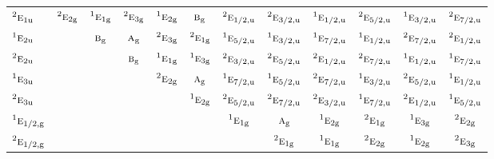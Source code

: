 \documentclass[10pt,a4paper]{article}
\numberwithin{equation}{section}
\newcommand{\irr}[1]{\text{\normalfont\scshape #1}}
\newcommand{\conjpair}[1]{{}^{#1}}
\newcommand{\ptag}[1]{\mathrm{#1}}
\begin{document}
{\begin{longtable}{@{}lccccccccccc@{}}
$\conjpair{2}\irr{e}_{1\ptag{u}}$ & $\conjpair{2}\irr{e}_{2\ptag{g}}$ & $\conjpair{1}\irr{e}_{1\ptag{g}}$ & $\conjpair{2}\irr{e}_{3\ptag{g}}$ & $\conjpair{1}\irr{e}_{2\ptag{g}}$ & $\irr{b}_{\ptag{g}}$ & $\conjpair{2}\irr{e}_{1/2,\ptag{u}}$ & $\conjpair{2}\irr{e}_{3/2,\ptag{u}}$ & $\conjpair{1}\irr{e}_{1/2,\ptag{u}}$ & $\conjpair{2}\irr{e}_{5/2,\ptag{u}}$ & $\conjpair{1}\irr{e}_{3/2,\ptag{u}}$ & $\conjpair{2}\irr{e}_{7/2,\ptag{u}}$\\
$\conjpair{1}\irr{e}_{2\ptag{u}}$ &  & $\irr{b}_{\ptag{g}}$ & $\irr{a}_{\ptag{g}}$ & $\conjpair{2}\irr{e}_{3\ptag{g}}$ & $\conjpair{2}\irr{e}_{1\ptag{g}}$ & $\conjpair{1}\irr{e}_{5/2,\ptag{u}}$ & $\conjpair{1}\irr{e}_{3/2,\ptag{u}}$ & $\conjpair{1}\irr{e}_{7/2,\ptag{u}}$ & $\conjpair{1}\irr{e}_{1/2,\ptag{u}}$ & $\conjpair{2}\irr{e}_{7/2,\ptag{u}}$ & $\conjpair{2}\irr{e}_{1/2,\ptag{u}}$\\
$\conjpair{2}\irr{e}_{2\ptag{u}}$ &  &  & $\irr{b}_{\ptag{g}}$ & $\conjpair{1}\irr{e}_{1\ptag{g}}$ & $\conjpair{1}\irr{e}_{3\ptag{g}}$ & $\conjpair{2}\irr{e}_{3/2,\ptag{u}}$ & $\conjpair{2}\irr{e}_{5/2,\ptag{u}}$ & $\conjpair{2}\irr{e}_{1/2,\ptag{u}}$ & $\conjpair{2}\irr{e}_{7/2,\ptag{u}}$ & $\conjpair{1}\irr{e}_{1/2,\ptag{u}}$ & $\conjpair{1}\irr{e}_{7/2,\ptag{u}}$\\
$\conjpair{1}\irr{e}_{3\ptag{u}}$ &  &  &  & $\conjpair{2}\irr{e}_{2\ptag{g}}$ & $\irr{a}_{\ptag{g}}$ & $\conjpair{1}\irr{e}_{7/2,\ptag{u}}$ & $\conjpair{1}\irr{e}_{5/2,\ptag{u}}$ & $\conjpair{2}\irr{e}_{7/2,\ptag{u}}$ & $\conjpair{1}\irr{e}_{3/2,\ptag{u}}$ & $\conjpair{2}\irr{e}_{5/2,\ptag{u}}$ & $\conjpair{1}\irr{e}_{1/2,\ptag{u}}$\\
$\conjpair{2}\irr{e}_{3\ptag{u}}$ &  &  &  &  & $\conjpair{1}\irr{e}_{2\ptag{g}}$ & $\conjpair{2}\irr{e}_{5/2,\ptag{u}}$ & $\conjpair{2}\irr{e}_{7/2,\ptag{u}}$ & $\conjpair{2}\irr{e}_{3/2,\ptag{u}}$ & $\conjpair{1}\irr{e}_{7/2,\ptag{u}}$ & $\conjpair{2}\irr{e}_{1/2,\ptag{u}}$ & $\conjpair{1}\irr{e}_{5/2,\ptag{u}}$\\
$\conjpair{1}\irr{e}_{1/2,\ptag{g}}$ &  &  &  &  &  & $\conjpair{1}\irr{e}_{1\ptag{g}}$ & $\irr{a}_{\ptag{g}}$ & $\conjpair{1}\irr{e}_{2\ptag{g}}$ & $\conjpair{2}\irr{e}_{1\ptag{g}}$ & $\conjpair{1}\irr{e}_{3\ptag{g}}$ & $\conjpair{2}\irr{e}_{2\ptag{g}}$\\
$\conjpair{2}\irr{e}_{1/2,\ptag{g}}$ &  &  &  &  &  &  & $\conjpair{2}\irr{e}_{1\ptag{g}}$ & $\conjpair{1}\irr{e}_{1\ptag{g}}$ & $\conjpair{2}\irr{e}_{2\ptag{g}}$ & $\conjpair{1}\irr{e}_{2\ptag{g}}$ & $\conjpair{2}\irr{e}_{3\ptag{g}}$\\

\end{longtable}}
\end{document}

